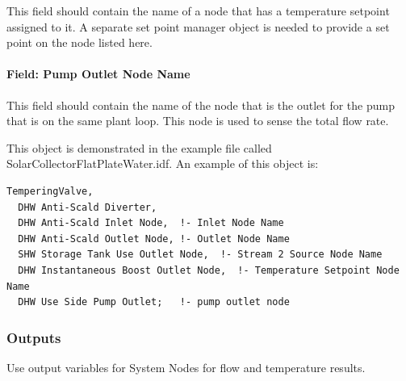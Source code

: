 This field should contain the name of a node that has a temperature setpoint assigned to it. A separate set point manager object is needed to provide a set point on the node listed here.

\paragraph{Field: Pump Outlet Node Name}\label{field-pump-outlet-node-name}

This field should contain the name of the node that is the outlet for the pump that is on the same plant loop. This node is used to sense the total flow rate.

This object is demonstrated in the example file called SolarCollectorFlatPlateWater.idf. An example of this object is:

\begin{lstlisting}
TemperingValve,
  DHW Anti-Scald Diverter,
  DHW Anti-Scald Inlet Node,  !- Inlet Node Name
  DHW Anti-Scald Outlet Node, !- Outlet Node Name
  SHW Storage Tank Use Outlet Node,  !- Stream 2 Source Node Name
  DHW Instantaneous Boost Outlet Node,  !- Temperature Setpoint Node Name
  DHW Use Side Pump Outlet;   !- pump outlet node
\end{lstlisting}

\subsubsection{Outputs}\label{outputs-023}

Use output variables for System Nodes for flow and temperature results.
